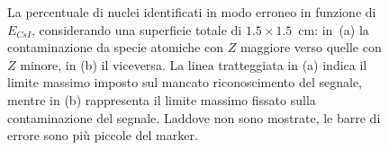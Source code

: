\begin{figure}[!p] 
	\centering
	\hspace{10mm}
	\caption{La percentuale di nuclei identificati in modo erroneo in funzione di $E_{CsI}$, considerando una superficie totale di $1.5 \times 1.5$~cm: in~(a) la contaminazione da specie atomiche con $Z$ maggiore verso quelle con $Z$ minore, in (b) il viceversa. La linea tratteggiata in (a) indica il limite massimo imposto sul mancato riconoscimento del segnale, mentre in (b) rappresenta il limite massimo fissato sulla contaminazione del segnale. Laddove non sono mostrate, le barre di errore sono più piccole del marker.} \label{fig:leakage_res_1.5}
\end{figure}






